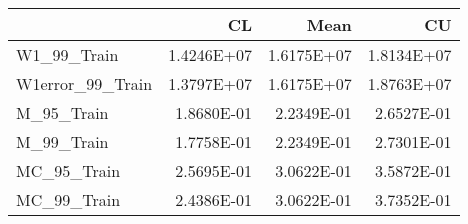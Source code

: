 \begin{tabular}{lrrr}
\toprule
{} &         CL &       Mean &         CU \\
\midrule
W1\_99\_Train      & 1.4246E+07 & 1.6175E+07 & 1.8134E+07 \\
W1error\_99\_Train & 1.3797E+07 & 1.6175E+07 & 1.8763E+07 \\
M\_95\_Train       & 1.8680E-01 & 2.2349E-01 & 2.6527E-01 \\
M\_99\_Train       & 1.7758E-01 & 2.2349E-01 & 2.7301E-01 \\
MC\_95\_Train      & 2.5695E-01 & 3.0622E-01 & 3.5872E-01 \\
MC\_99\_Train      & 2.4386E-01 & 3.0622E-01 & 3.7352E-01 \\
\bottomrule
\end{tabular}
